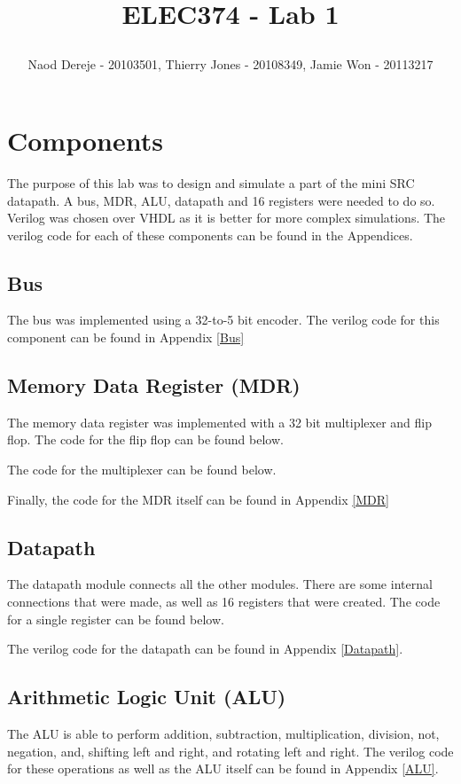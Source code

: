 \documentclass{article}
\title{
    \begin{large}
        ELEC374 - Lab 1
    \end{large}
}
\author{Naod Dereje - 20103501, Thierry Jones - 20108349, Jamie Won - 20113217}
\begin{document}
\maketitle
\cleardoublepage
\tableofcontents
\cleardoublepage

\section{Components}
    The purpose of this lab was to design and simulate a part of the mini SRC datapath. A bus, MDR, ALU, datapath and 16 registers were needed to do so. Verilog was chosen over VHDL as it is better for more complex simulations. The verilog code for each of these components can be found in the Appendices.

    \subsection{Bus}
    The bus was implemented using a 32-to-5 bit encoder. The verilog code for this component can be found in Appendix \ref{Bus}

    \subsection{Memory Data Register (MDR)}
    The memory data register was implemented with a 32 bit multiplexer and flip flop. The code for the flip flop can be found below.
        
    The code for the multiplexer can be found below.
        
    Finally, the code for the MDR itself can be found in Appendix \ref{MDR}

    \subsection{Datapath}
    The datapath module connects all the other modules. There are some internal connections that were made, as well as 16 registers that were created. The code for a single register can be found below.
        
    The verilog code for the datapath can be found in Appendix \ref{Datapath}.

    \subsection{Arithmetic Logic Unit (ALU)}
    The ALU is able to perform addition, subtraction, multiplication, division, not, negation, and, shifting left and right, and rotating left and right. The verilog code for these operations as well as the ALU itself can be found in Appendix \ref{ALU}.
\end{document}
